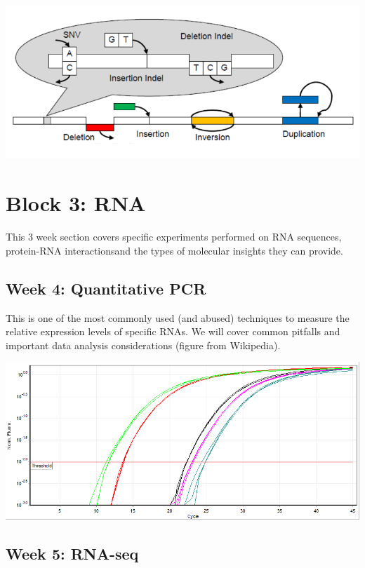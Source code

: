 \documentclass[]{book}
\begin{document}
\begin{center}\includegraphics[width=10.86in]{classes/images/variants} \end{center}

\hypertarget{block-rna}{%
\chapter{Block 3: RNA}\label{block-rna}}

This 3 week section covers specific experiments performed on RNA sequences, protein-RNA interactionsand the types of molecular insights they can provide.

\hypertarget{week-4-quantitative-pcr}{%
\section{Week 4: Quantitative PCR}\label{week-4-quantitative-pcr}}

This is one of the most commonly used (and abused) techniques to measure the relative expression levels of specific RNAs. We will cover common pitfalls and important data analysis considerations (figure from Wikipedia).

\begin{center}\includegraphics[width=11.83in]{classes/images/qpcr} \end{center}

\hypertarget{week-5-rna-seq}{%
\section{Week 5: RNA-seq}\label{week-5-rna-seq}}
\end{document}
